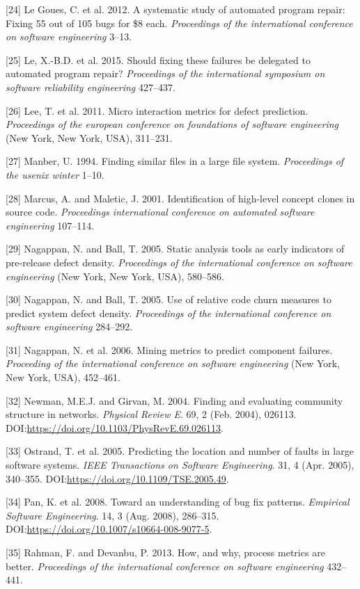 \documentclass[sigconf]{acmart}
\begin{document}
[24] Le Goues, C. et al. 2012. A systematic study of automated
program repair: Fixing 55 out of 105 bugs for \$8 each.
\emph{Proceedings of the international conference on software
engineering} 3--13.


[25] Le, X.-B.D. et al. 2015. Should fixing these failures be
delegated to automated program repair? \emph{Proceedings of the
international symposium on software reliability engineering} 427--437.


[26] Lee, T. et al. 2011. Micro interaction metrics for defect
prediction. \emph{Proceedings of the european conference on foundations
of software engineering} (New York, New York, USA), 311--231.


[27] Manber, U. 1994. Finding similar files in a large file system.
\emph{Proceedings of the usenix winter} 1--10.


[28] Marcus, A. and Maletic, J. 2001. Identification of high-level
concept clones in source code. \emph{Proceedings international
conference on automated software engineering} 107--114.


[29] Nagappan, N. and Ball, T. 2005. Static analysis tools as early
indicators of pre-release defect density. \emph{Proceedings of the
international conference on software engineering} (New York, New York,
USA), 580--586.


[30] Nagappan, N. and Ball, T. 2005. Use of relative code churn
measures to predict system defect density. \emph{Proceedings of the
international conference on software engineering} 284--292.


[31] Nagappan, N. et al. 2006. Mining metrics to predict component
failures. \emph{Proceeding of the international conference on software
engineering} (New York, New York, USA), 452--461.


[32] Newman, M.E.J. and Girvan, M. 2004. Finding and evaluating
community structure in networks. \emph{Physical Review E}. 69, 2 (Feb.
2004), 026113. DOI:\url{https://doi.org/10.1103/PhysRevE.69.026113}.


[33] Ostrand, T. et al. 2005. Predicting the location and number of
faults in large software systems. \emph{IEEE Transactions on Software
Engineering}. 31, 4 (Apr. 2005), 340--355.
DOI:\url{https://doi.org/10.1109/TSE.2005.49}.


[34] Pan, K. et al. 2008. Toward an understanding of bug fix
patterns. \emph{Empirical Software Engineering}. 14, 3 (Aug. 2008),
286--315. DOI:\url{https://doi.org/10.1007/s10664-008-9077-5}.


[35] Rahman, F. and Devanbu, P. 2013. How, and why, process metrics
are better. \emph{Proceedings of the international conference on
software engineering} 432--441.
\end{document}
